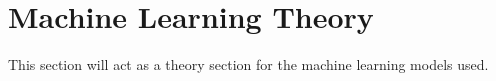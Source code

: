 \chapter{Machine Learning Theory} \label{chap:ml}

This section will act as a theory section for the machine learning models used. \bigskip
